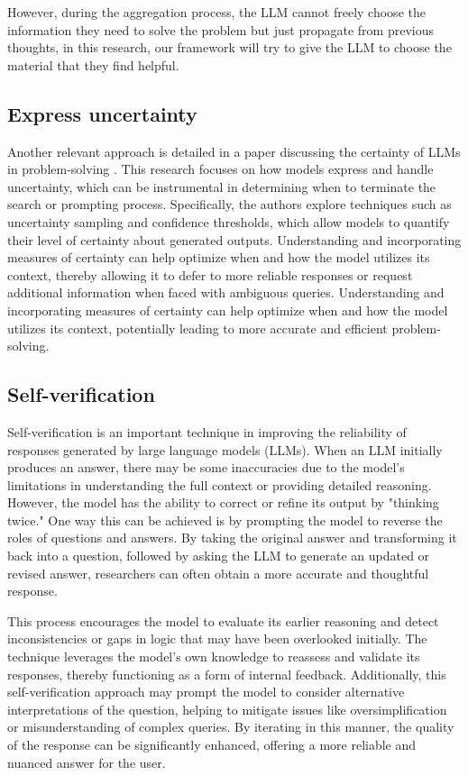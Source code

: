 \documentclass{article}
\begin{document}
However, during the aggregation process, the LLM cannot freely choose the information they need to solve the problem but just propagate from previous thoughts, in this research, our framework will try to give the LLM to choose the material that they find helpful.

\subsection{Express uncertainty}

Another relevant approach is detailed in a paper discussing the certainty of LLMs in problem-solving \cite{lin2022teachingmodelsexpressuncertainty}. This research focuses on how models express and handle uncertainty, which can be instrumental in determining when to terminate the search or prompting process. Specifically, the authors explore techniques such as uncertainty sampling and confidence thresholds, which allow models to quantify their level of certainty about generated outputs. Understanding and incorporating measures of certainty can help optimize when and how the model utilizes its context, thereby allowing it to defer to more reliable responses or request additional information when faced with ambiguous queries. Understanding and incorporating measures of certainty can help optimize when and how the model utilizes its context, potentially leading to more accurate and efficient problem-solving.

\subsection{Self-verification}

Self-verification \cite{weng2023largelanguagemodelsbetter} is an important technique in improving the reliability of responses generated by large language models (LLMs). When an LLM initially produces an answer, there may be some inaccuracies due to the model’s limitations in understanding the full context or providing detailed reasoning. However, the model has the ability to correct or refine its output by "thinking twice." One way this can be achieved is by prompting the model to reverse the roles of questions and answers. By taking the original answer and transforming it back into a question, followed by asking the LLM to generate an updated or revised answer, researchers can often obtain a more accurate and thoughtful response.

This process encourages the model to evaluate its earlier reasoning and detect inconsistencies or gaps in logic that may have been overlooked initially. The technique leverages the model’s own knowledge to reassess and validate its responses, thereby functioning as a form of internal feedback. Additionally, this self-verification approach may prompt the model to consider alternative interpretations of the question, helping to mitigate issues like oversimplification or misunderstanding of complex queries. By iterating in this manner, the quality of the response can be significantly enhanced, offering a more reliable and nuanced answer for the user.
\end{document}
